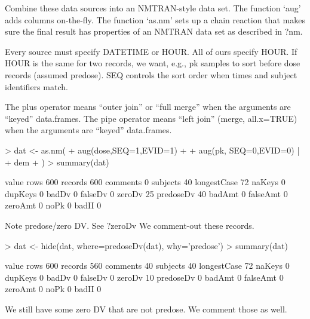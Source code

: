 Combine these data sources into an NMTRAN-style data set.
The function `aug' adds columns on-the-fly.
The function `as.nm' sets up a chain reaction that makes sure the
final result has properties of an NMTRAN data set as described in ?nm.

Every source must specify DATETIME or HOUR.  All of ours specify HOUR.
If HOUR is the same for two records, we want, e.g., pk samples to sort 
before dose records (assumed predose).  SEQ controls the sort order 
when times and subject identifiers match.

The plus operator means ``outer join'' or ``full merge'' when the arguments are ``keyed'' data.frames.
The pipe operator means ``left join'' (merge, all.x=TRUE) when the arguments are ``keyed'' data.frames.
\begin{Schunk}
\begin{Sinput}
> dat <- as.nm( 
+ 	  aug(dose,SEQ=1,EVID=1) + 
+ 	  aug(pk,  SEQ=0,EVID=0) | 
+ 	  dem
+ )
> summary(dat)
\end{Sinput}
\begin{Soutput}
            value
rows          600
records       600
comments        0
subjects       40
longestCase    72
naKeys          0
dupKeys         0
badDv           0
falseDv         0
zeroDv         25
predoseDv      40
badAmt          0
falseAmt        0
zeroAmt         0
noPk            0
badII           0
\end{Soutput}
\end{Schunk}
Note predose/zero DV.
See ?zeroDv
We comment-out these records.
\begin{Schunk}
\begin{Sinput}
> dat <- hide(dat, where=predoseDv(dat), why='predose')
> summary(dat)
\end{Sinput}
\begin{Soutput}
            value
rows          600
records       560
comments       40
subjects       40
longestCase    72
naKeys          0
dupKeys         0
badDv           0
falseDv         0
zeroDv         10
predoseDv       0
badAmt          0
falseAmt        0
zeroAmt         0
noPk            0
badII           0
\end{Soutput}
\end{Schunk}
We still have some zero DV that are not predose.  We comment those as well.
